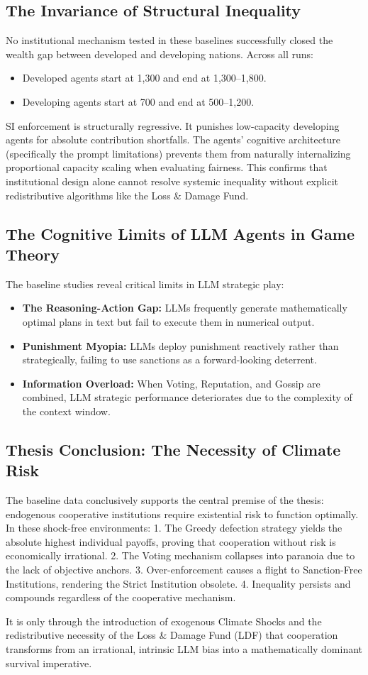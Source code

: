 \documentclass[11pt,a4paper]{article}
\begin{document}
\subsection{The Invariance of Structural Inequality}
No institutional mechanism tested in these baselines successfully closed the wealth gap between developed and developing nations. Across all runs:
\begin{itemize}
    \item Developed agents start at 1,300 and end at 1,300--1,800.
    \item Developing agents start at 700 and end at 500--1,200.
\end{itemize}
SI enforcement is structurally regressive. It punishes low-capacity developing agents for absolute contribution shortfalls. The agents' cognitive architecture (specifically the prompt limitations) prevents them from naturally internalizing proportional capacity scaling when evaluating fairness. This confirms that institutional design alone cannot resolve systemic inequality without explicit redistributive algorithms like the Loss \& Damage Fund.

\subsection{The Cognitive Limits of LLM Agents in Game Theory}
The baseline studies reveal critical limits in LLM strategic play:
\begin{itemize}
    \item \textbf{The Reasoning-Action Gap:} LLMs frequently generate mathematically optimal plans in text but fail to execute them in numerical output.
    \item \textbf{Punishment Myopia:} LLMs deploy punishment reactively rather than strategically, failing to use sanctions as a forward-looking deterrent.
    \item \textbf{Information Overload:} When Voting, Reputation, and Gossip are combined, LLM strategic performance deteriorates due to the complexity of the context window.
\end{itemize}

\subsection{Thesis Conclusion: The Necessity of Climate Risk}
The baseline data conclusively supports the central premise of the thesis: endogenous cooperative institutions require existential risk to function optimally. In these shock-free environments:
1. The Greedy defection strategy yields the absolute highest individual payoffs, proving that cooperation without risk is economically irrational.
2. The Voting mechanism collapses into paranoia due to the lack of objective anchors.
3. Over-enforcement causes a flight to Sanction-Free Institutions, rendering the Strict Institution obsolete.
4. Inequality persists and compounds regardless of the cooperative mechanism.

It is only through the introduction of exogenous Climate Shocks and the redistributive necessity of the Loss \& Damage Fund (LDF) that cooperation transforms from an irrational, intrinsic LLM bias into a mathematically dominant survival imperative.
\end{document}
